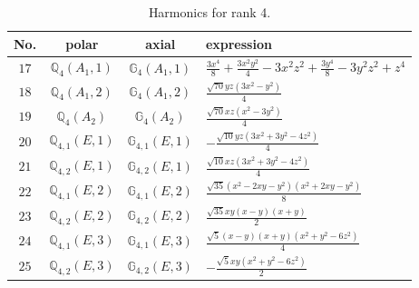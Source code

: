 \documentclass[fleqn,8pt,landscape]{jsarticle}
\begin{document}
\begin{table}[ht!]
\begin{center}
\caption{Harmonics for rank 4.}
\renewcommand{\arraystretch}{1.3}
\begin{tabular}{cccl} \hline \hline
No. & polar & axial & expression \\ \hline
$ 17 $ & $ \mathbb{Q}_{4}(A_{1},1) $ & $ \mathbb{G}_{4}(A_{1},1) $ & $ \frac{3 x^{4}}{8} + \frac{3 x^{2} y^{2}}{4} - 3 x^{2} z^{2} + \frac{3 y^{4}}{8} - 3 y^{2} z^{2} + z^{4} $ \\
$ 18 $ & $ \mathbb{Q}_{4}(A_{1},2) $ & $ \mathbb{G}_{4}(A_{1},2) $ & $ \frac{\sqrt{70} y z \left(3 x^{2} - y^{2}\right)}{4} $ \\
$ 19 $ & $ \mathbb{Q}_{4}(A_{2}) $ & $ \mathbb{G}_{4}(A_{2}) $ & $ \frac{\sqrt{70} x z \left(x^{2} - 3 y^{2}\right)}{4} $ \\
$ 20 $ & $ \mathbb{Q}_{4,1}(E,1) $ & $ \mathbb{G}_{4,1}(E,1) $ & $ - \frac{\sqrt{10} y z \left(3 x^{2} + 3 y^{2} - 4 z^{2}\right)}{4} $ \\
$ 21 $ & $ \mathbb{Q}_{4,2}(E,1) $ & $ \mathbb{G}_{4,2}(E,1) $ & $ \frac{\sqrt{10} x z \left(3 x^{2} + 3 y^{2} - 4 z^{2}\right)}{4} $ \\
$ 22 $ & $ \mathbb{Q}_{4,1}(E,2) $ & $ \mathbb{G}_{4,1}(E,2) $ & $ \frac{\sqrt{35} \left(x^{2} - 2 x y - y^{2}\right) \left(x^{2} + 2 x y - y^{2}\right)}{8} $ \\
$ 23 $ & $ \mathbb{Q}_{4,2}(E,2) $ & $ \mathbb{G}_{4,2}(E,2) $ & $ \frac{\sqrt{35} x y \left(x - y\right) \left(x + y\right)}{2} $ \\
$ 24 $ & $ \mathbb{Q}_{4,1}(E,3) $ & $ \mathbb{G}_{4,1}(E,3) $ & $ \frac{\sqrt{5} \left(x - y\right) \left(x + y\right) \left(x^{2} + y^{2} - 6 z^{2}\right)}{4} $ \\
$ 25 $ & $ \mathbb{Q}_{4,2}(E,3) $ & $ \mathbb{G}_{4,2}(E,3) $ & $ - \frac{\sqrt{5} x y \left(x^{2} + y^{2} - 6 z^{2}\right)}{2} $ \\
 \hline \hline
\end{tabular}
\end{center}
\end{table}
\end{document}
